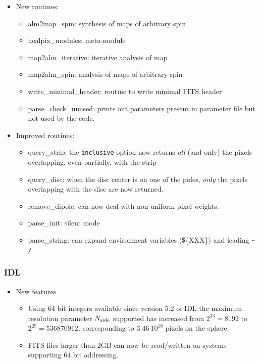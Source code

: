 \documentclass[12pt,twoside]{article}
\newcommand{\nside}{{N_{\rm side}}}
\begin{document}
{{\begin{itemize}
\item New routines: 
\begin{itemize}
	\item {alm2map\_spin}: synthesis of maps of arbitrary spin
	\item {healpix\_modules}: meta-module
	\item {map2alm\_iterative}: iterative analysis of map
	\item {map2alm\_spin}: analysis of maps of arbitrary spin
	\item {write\_minimal\_header}: routine to write minimal FITS header
	\item {parse\_check\_unused}: prints out parameters present in parameter file but not used by the code.
\end{itemize}
\item Improved routines:
\begin{itemize}
\item {query\_strip}: the {\tt inclusive} option now
returns {\em all} (and only) the pixels overlapping, even partially, with the
strip
\item {query\_disc}: when the disc center is on one of
the poles, {\em only} the pixels overlapping with the disc are now returned.
\item {remove\_dipole}: can now deal with non-uniform
pixel weights.
\item parse\_init: silent mode
\item parse\_string: can expand environment variables
(\$\{XXX\}) and leading \verb+~+$\!${\tt /}
\end{itemize}

  \end{itemize}
\subsubsection[New Features: IDL]{IDL} 
  \begin{itemize}
    \item New features
  \begin{itemize}
	\item Using 64 bit integers available since version 5.2 of IDL the maximum resolution parameter $\nside$ supported has increased
from $2^{13}=8192$ to $2^{29}=536870912$, corresponding to $3.46\ 10^{18}$
pixels on the sphere.
	\item FITS files larger than 2GB can now be read/written on systems
    supporting 64 bit addressing.
  \end{itemize}


\end{itemize}}}
\end{document}
